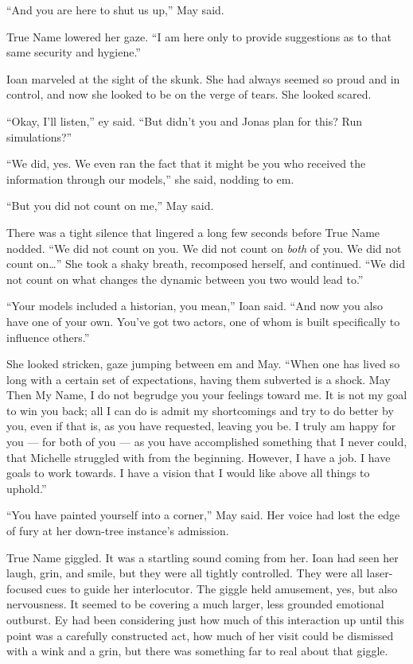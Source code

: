 ``And you are here to shut us up,'' May said.

True Name lowered her gaze. ``I am here only to provide suggestions as to that same security and hygiene.''

Ioan marveled at the sight of the skunk. She had always seemed so proud and in control, and now she looked to be on the verge of tears. She looked scared.

``Okay, I'll listen,'' ey said. ``But didn't you and Jonas plan for this? Run simulations?''

``We did, yes. We even ran the fact that it might be you who received the information through our models,'' she said, nodding to em.

``But you did not count on me,'' May said.

There was a tight silence that lingered a long few seconds before True Name nodded. ``We did not count on you. We did not count on \emph{both} of you. We did not count on\ldots{}'' She took a shaky breath, recomposed herself, and continued. ``We did not count on what changes the dynamic between you two would lead to.''

``Your models included a historian, you mean,'' Ioan said. ``And now you also have one of your own. You've got two actors, one of whom is built specifically to influence others.''

She looked stricken, gaze jumping between em and May. ``When one has lived so long with a certain set of expectations, having them subverted is a shock. May Then My Name, I do not begrudge you your feelings toward me. It is not my goal to win you back; all I can do is admit my shortcomings and try to do better by you, even if that is, as you have requested, leaving you be. I truly am happy for you — for both of you — as you have accomplished something that I never could, that Michelle struggled with from the beginning. However, I have a job. I have goals to work towards. I have a vision that I would like above all things to uphold.''

``You have painted yourself into a corner,'' May said. Her voice had lost the edge of fury at her down-tree instance's admission.

True Name giggled. It was a startling sound coming from her. Ioan had seen her laugh, grin, and smile, but they were all tightly controlled. They were all laser-focused cues to guide her interlocutor. The giggle held amusement, yes, but also nervousness. It seemed to be covering a much larger, less grounded emotional outburst. Ey had been considering just how much of this interaction up until this point was a carefully constructed act, how much of her visit could be dismissed with a wink and a grin, but there was something far to real about that giggle.

